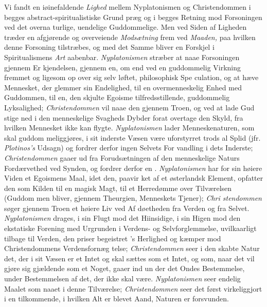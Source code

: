 Vi fandt en iøinefaldende \emph{Lighed} mellem Nyplatonismen
og Christendommen i begges abstract-spiritualistiske Grund\-%
præg og i begges Retning mod Forsoningen ved det overna\-%
turlige, uendelige Guddommelige. Men ved Siden af Ligheden
træder en afgjørende og overveiende \emph{Modsætning} frem ved
\emph{Maaden,} paa hvilken denne Forsoning tilstræbes, og med det
Samme bliver en Forskjel i Spiritualismens \emph{Art} aabenbar.
\emph{Nyplatonismen} stræber at naae Forsoningen gjennem Er\-%
kjendelsen, gjennem en, om end ved en guddommelig Virkning
fremmet og ligesom op over sig selv løftet, philosophisk Spe\-%
culation, og at hæve Mennesket, der glemmer sin Endelighed,
til en overmenneskelig Enhed med Guddommen, til en, den
skjulte Egoisme tilfredsstillende, guddommelig Lyksalighed;
\emph{Christendommen} vil naae den gjennem Troen, og ved at
lade Gud stige ned i den menneskelige Svagheds Dybder forat
overtage den Skyld, fra hvilken Mennesket ikke kan flygte.
\emph{Nyplatonismen} lader Menneskenaturen, som skal guddom\-%
meliggjøres, i sit inderste Væsen være uforstyrret trods al Splid
(jfr. \emph{Plotinos's} Udsagn) og fordrer derfor ingen Selvets For\-%
vandling i dets Inderste; \emph{Christendommen} gaaer ud fra
Forudsætningen af den menneskelige Naturs Fordærvethed ved
Synden, og fordrer derfor en . \emph{Nyplatonismen}
har for sin høiere Viden et Egoismens Maal, idet den, paavir\-%
ket af et østerlandsk Element, opfatter den som Kilden til en
magisk Magt, til et Herredømme over Tilværelsen (Guddom\-%
men bliver, gjennem Theurgien, Menneskets Tjener); \emph{Chri\-%
stendommen} søger gjennem Troen et høiere Liv ved Af\-%
døetheden fra Verden og fra Selvet. \emph{Nyplatonismen} drages,
i sin Flugt mod det Hiinsidige, i sin Higen mod den ekstatiske
Forening med Urgrunden i Verdens- og Selvforglemmelse,
uvilkaarligt tilbage til Verden, den priser begeistret 's
Herlighed og kæmper mod Christendommens Verdensfornæg\-%
telse; \emph{Christendommen} seer i den skabte Natur det, der i
sit Væsen er et Intet og skal sættes som et Intet, og som,
naar det vil gjøre sig gjældende som et Noget, gaaer ind un\-%
der det Ondes Bestemmelse, under Bestemmelsen af det, der
ikke skal være. \emph{Nyplatonismen} seer endelig Maalet som
naaet i denne Tilværelse; \emph{Christendommen} seer det først
virkeliggjort i en tilkommende, i hvilken Alt er blevet Aand,
Naturen er forsvunden.

